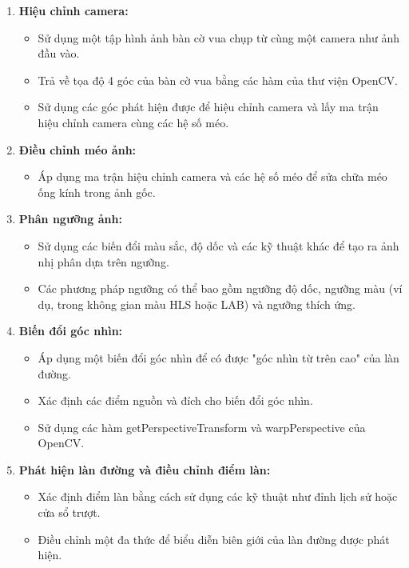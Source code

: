 \begin{enumerate}
    \item \textbf{Hiệu chỉnh camera:}
    \begin{itemize}
        \item Sử dụng một tập hình ảnh bàn cờ vua chụp từ cùng một camera như ảnh đầu vào.
        \item Trả về tọa độ 4 góc của bàn cờ vua bằng các hàm của thư viện OpenCV.
        \item Sử dụng các góc phát hiện được để hiệu chỉnh camera và lấy ma trận hiệu chỉnh camera cùng các hệ số méo.
    \end{itemize}

    \item \textbf{Điều chỉnh méo ảnh:}
    \begin{itemize}
        \item Áp dụng ma trận hiệu chỉnh camera và các hệ số méo để sửa chữa méo ống kính trong ảnh gốc.
    \end{itemize}

    \item \textbf{Phân ngưỡng ảnh:}
    \begin{itemize}
        \item Sử dụng các biến đổi màu sắc, độ dốc và các kỹ thuật khác để tạo ra ảnh nhị phân dựa trên ngưỡng.
        \item Các phương pháp ngưỡng có thể bao gồm ngưỡng độ dốc, ngưỡng màu (ví dụ, trong không gian màu HLS hoặc LAB) và ngưỡng thích ứng.
    \end{itemize}

    \item \textbf{Biến đổi góc nhìn:}
    \begin{itemize}
        \item Áp dụng một biến đổi góc nhìn để có được "góc nhìn từ trên cao" của làn đường.
        \item Xác định các điểm nguồn và đích cho biến đổi góc nhìn.
        \item Sử dụng các hàm getPerspectiveTransform và warpPerspective của OpenCV.
    \end{itemize}

    \item \textbf{Phát hiện làn đường và điều chỉnh điểm làn:}
    \begin{itemize}
        \item Xác định điểm làn bằng cách sử dụng các kỹ thuật như đỉnh lịch sử hoặc cửa sổ trượt.
        \item Điều chỉnh một đa thức để biểu diễn biên giới của làn đường được phát hiện.
    \end{itemize}


\end{enumerate}
